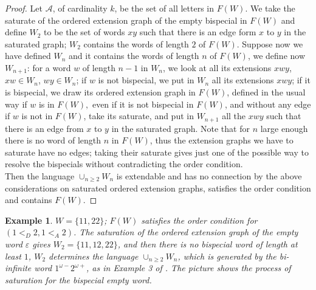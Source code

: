 \documentclass[12pt,a4paper]{amsart}
\newtheorem{example}{Example}
\begin{document}
\begin{proof}
Let $\mathcal A$, of cardinality $k$, be the set of all letters in  $F(W).$ We  take the saturate of the ordered extension graph of the empty bispecial in $F(W)$ and define $ W_2$ to be the set of words $xy$ such that there is an edge form $x$ to $y$ in the saturated graph; 
$W_2$ contains the words of length $2$ of $F(W)$. Suppose now we have defined $W_n$ and it contains the words of length $n$ of $F(W)$, we define now $W_{n+1}$: for a word $w$ of length $n-1$ in $W_n$, we look at  all its extensions $xwy$, $xw\in W_n$, $wy \in W_n$; 
if $w$  is not bispecial, we put in $W_n$ all its extensions $xwy$; if it is bispecial, we draw
 its ordered extension graph in $F(W)$, defined in the usual way  if $w$ is in $F(W),$ even if it is not  bispecial in $F(W)$, and without any edge if $w$ is not in $F(W)$, take its saturate, and put in $W_{n+1}$ all the $xwy$ such that there is an edge from $x$ to $y$ in the saturated graph. Note that for $n$ large enough there is no word of length $n$ in  $F(W)$, thus the extension graphs we have to saturate have no edges; taking their saturate gives  just one of the possible way to resolve the bispecials  without contradicting the order condition.\\

Then the language $\cup_{n\geq 2} W_n$ is extendable and has no connection by the above considerations on saturated ordered extension graphs, satisfies the order condition and contains $F(W)$.\end{proof}

\begin{example}\label{e4}  $W=\{11,22\}$; $F(W)$ satisfies the order condition for  $(1<_D 2,1<_A 2)$. The saturation of the ordered extension graph of the empty word $\varepsilon$ gives
 $W_2=\{11,12,22\}$, and then there is no bispecial word of length at least $1$, $W_2$ determines the language  $\cup_{n\geq 2} W_n$, which is generated by the bi-infinite word $1^{\omega-}2^{\omega+}$, as in  Example 3 of \cite{fhuz}. The picture shows the process of saturation for the bispecial empty word.\end{example}
\end{document}
